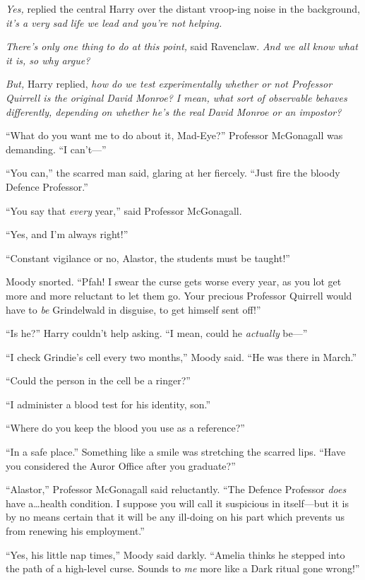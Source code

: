 \emph{Yes,} replied the central Harry over the distant vroop-ing noise in the background, \emph{it’s a very sad life we lead and \emph{you’re not helping}.}

\emph{There’s only one thing to do at this point,} said Ravenclaw. \emph{And we all know what it is, so why argue?}

\emph{But,} Harry replied, \emph{how \emph{do} we test experimentally whether or not Professor Quirrell is the original David Monroe? I mean, what sort of observable behaves differently, depending on whether he’s the real David Monroe or an impostor?}

“What do you want me to do about it, Mad-Eye?” Professor McGonagall was demanding. “I can’t—”

“You can,” the scarred man said, glaring at her fiercely. “Just fire the bloody Defence Professor.”

“You say that \emph{every} year,” said Professor McGonagall.

“Yes, and I’m always right!”

“Constant vigilance or no, Alastor, the students must be taught!”

Moody snorted. “Pfah! I swear the curse gets worse every year, as you lot get more and more reluctant to let them go. Your precious Professor Quirrell would have to \emph{be} Grindelwald in disguise, to get himself sent off!”

“Is he?” Harry couldn’t help asking. “I mean, could he \emph{actually} be—”

“I check Grindie’s cell every two months,” Moody said. “He was there in March.”

“Could the person in the cell be a ringer?”

“I administer a blood test for his identity, son.”

“Where do you keep the blood you use as a reference?”

“In a safe place.” Something like a smile was stretching the scarred lips. “Have you considered the Auror Office after you graduate?”

“Alastor,” Professor McGonagall said reluctantly. “The Defence Professor \emph{does} have a…health condition. I suppose you will call it suspicious in itself—but it is by no means certain that it will be any ill-doing on his part which prevents us from renewing his employment.”

“Yes, his little nap times,” Moody said darkly. “Amelia thinks he stepped into the path of a high-level curse. Sounds to \emph{me} more like a Dark ritual gone wrong!”

